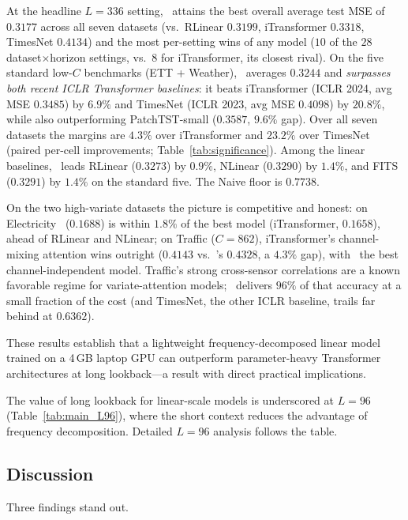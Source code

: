At the headline $L{=}336$ setting, \method\ attains the best overall average
test MSE of $0.3177$ across all seven datasets (vs.\ RLinear $0.3199$,
iTransformer $0.3318$, TimesNet $0.4134$) and the most per-setting wins of any
model ($10$ of the $28$ dataset$\times$horizon settings, vs.\ $8$ for
iTransformer, its closest rival). On the five standard low-$C$ benchmarks
(ETT + Weather), \method\ averages $0.3244$ and \emph{surpasses both recent
ICLR Transformer baselines}: it beats iTransformer (ICLR 2024, avg MSE $0.3485$)
by $\mathbf{6.9\%}$ and TimesNet (ICLR 2023, avg MSE $0.4098$) by
$\mathbf{20.8\%}$, while also outperforming PatchTST-small ($0.3587$, $9.6\%$
gap). Over all seven datasets the margins are $4.3\%$ over iTransformer and
$23.2\%$ over TimesNet (paired per-cell improvements; Table~\ref{tab:significance}).
Among the linear baselines, \method\ leads RLinear ($0.3273$) by $0.9\%$,
NLinear ($0.3290$) by $1.4\%$, and FITS ($0.3291$) by $1.4\%$ on the standard
five. The Naive floor is $0.7738$.

On the two high-variate datasets the picture is competitive and honest:
on Electricity \method\ ($0.1688$) is within $1.8\%$ of the best model
(iTransformer, $0.1658$), ahead of RLinear and NLinear; on Traffic
($C{=}862$), iTransformer's channel-mixing attention wins outright ($0.4143$
vs.\ \method's $0.4328$, a $4.3\%$ gap), with \method\ the best
channel-independent model. Traffic's strong cross-sensor correlations are a
known favorable regime for variate-attention models; \method\ delivers
$96\%$ of that accuracy at a small fraction of the cost (and TimesNet, the
other ICLR baseline, trails far behind at $0.6362$).

These results establish that a lightweight frequency-decomposed linear model
trained on a 4\,GB laptop GPU can outperform parameter-heavy Transformer
architectures at long lookback---a result with direct practical implications.

The value of long lookback for linear-scale models is underscored at $L{=}96$
(Table~\ref{tab:main_L96}), where the short context reduces the advantage of
frequency decomposition. Detailed $L{=}96$ analysis follows the table.

\subsection{Discussion}
\label{sec:results:discussion}

Three findings stand out.

